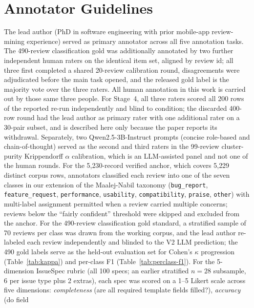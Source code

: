 \documentclass[preprint,12pt]{elsarticle}
\begin{document}
\section{Annotator Guidelines}\label{appendix:annotators}

  The lead author (PhD in software engineering with prior mobile-app review-mining experience)
  served as primary annotator across all five annotation tasks. The 490-review classification
  gold was additionally annotated by two further independent human raters on the identical item
  set, aligned by review id; all three first completed a shared 20-review calibration round,
  disagreements were adjudicated before the main task opened, and the released gold label is the
  majority vote over the three raters. All human annotation in this work is carried out by
  those same three people. For Stage~4, all three raters scored all 200 rows of the reported
  re-run independently and blind to condition; the discarded 400-row round had the lead author as
  primary rater with one additional rater on a 30-pair subset, and is described here only because
  the paper reports its withdrawal. Separately, two Qwen2.5-3B-Instruct prompts (concise
  role-based and chain-of-thought) served as the second and third raters in the 99-review
  cluster-purity Krippendorff $\alpha$ calibration, which is an LLM-assisted panel and not one of
  the human rounds. For the 5{,}230-record verified anchor, which covers 5{,}229 distinct corpus rows, annotators classified each review into
  one of the seven classes in our extension of the Maalej-Nabil taxonomy (\texttt{bug\_report}, \texttt{feature\_request},
  \texttt{performance}, \texttt{usability}, \texttt{compatibility}, \texttt{praise},
  \texttt{other}) with multi-label assignment permitted when a review carried multiple concerns;
   reviews below the ``fairly confident'' threshold were skipped and excluded from the anchor.
  For the 490-review classification gold standard, a stratified sample of 70 reviews per class
  was drawn from the working corpus, and the lead author re-labeled each review independently
  and blinded to the V2 LLM prediction; the 490 gold labels serve as the held-out evaluation set
   for Cohen's $\kappa$ progression (Table~\ref{tab:kappa}) and per-class F1
  (Table~\ref{tab:perclass-f1}). For the 5-dimension IssueSpec rubric (all 100 specs; an earlier stratified $n=28$ subsample, 6 per issue
   type plus 2 extras), each spec was scored on a 1--5 Likert scale across five dimensions:
  \emph{completeness} (are all required template fields filled?), \emph{accuracy} (do field
\end{document}
